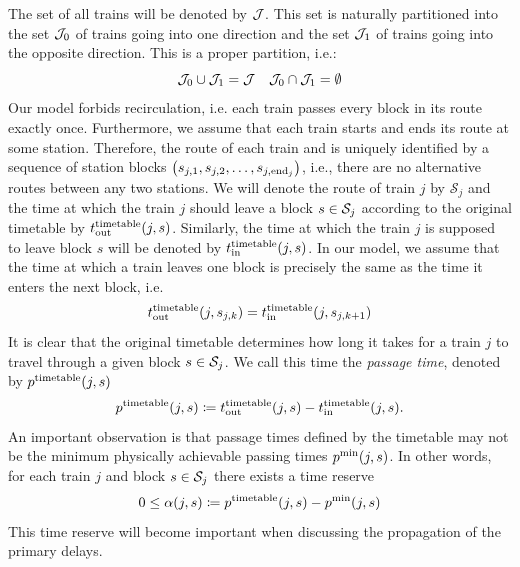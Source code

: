 The set of all trains will be denoted by $\mathcal{J}$. This set is naturally
partitioned into the set $\mathcal{J}_0$ of trains going into one direction and the set
$\mathcal{J}_1$ of trains going into the opposite direction. This is a proper
partition, i.e.:
\begin{equation}
  \mathcal{J}_0 \cup \mathcal{J}_1 = \mathcal{J} \quad \mathcal{J}_0 \cap \mathcal{J}_1 = \emptyset
\end{equation}
Our model forbids recirculation, i.e. each train passes every block in its
route exactly once. Furthermore, we assume that each train starts and ends its
route at some station. Therefore, the route of each train and is uniquely
identified by a sequence of station blocks $\left(s_{j,1}, s_{j, 2}, \ldots,
  s_{j, \operatorname*{end}_j}\right)$, i.e., there are no alternative routes between any two
stations. We will denote the route of train $j$ by $\mathcal{S}_{j}$ and the
time at which the train $j$ should leave a block $s \in \mathcal{S}_j$ according to the
original timetable by $t_\text{out}^\text{timetable}(j, s)$. Similarly, the time at which the train
$j$ is supposed to leave block $s$ will be denoted by $t_\text{in}^\text{timetable}(j, s)$. In our
model, we assume that the time at which a train leaves one block is precisely
the same as the time it enters the next block, i.e.
\begin{equation}
  t_\text{out}^\text{timetable}(j, s_{j,k}) = t_\text{in}^\text{timetable}(j, s_{j,k+1})
\end{equation}
It is clear that the original timetable determines how long it takes for a
train $j$ to travel through a given block $s \in \mathcal{S}_j$. We call this time the
\emph{passage time}, denoted by $p^\text{timetable}(j, s)$
\begin{equation}
  p^\text{timetable}(j, s) \coloneq t_\text{out}^\text{timetable}(j, s) - t_\text{in}^\text{timetable}(j, s).
\end{equation}
An important observation is that passage times defined by the timetable may not
be the minimum physically achievable passing times $p^\text{min}(j, s)$. In other
words, for each train $j$ and block $s \in \mathcal{S}_j$ there exists a time reserve
\begin{equation}
  \label{eq:pt}
  0 \le \alpha(j, s) \coloneq p^\text{timetable}(j, s) - p^\text{min}(j, s)
\end{equation}
This time reserve will become important when discussing the propagation of the
primary delays.

